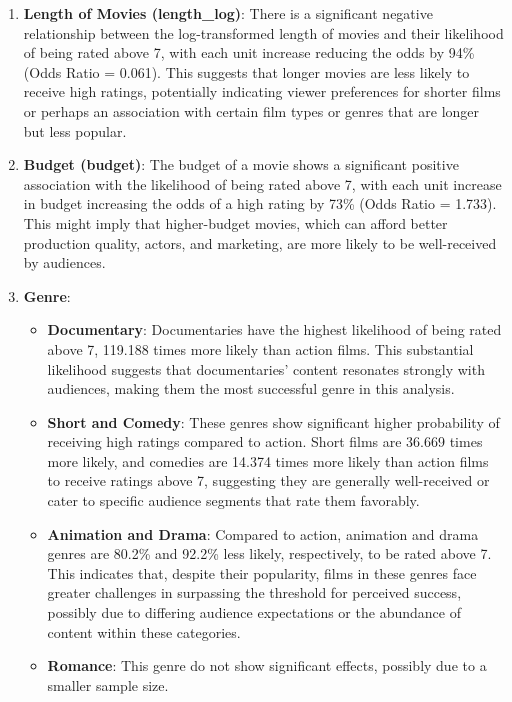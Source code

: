 \documentclass[
  11pt,
]{article}
\providecommand{\tightlist}{%
  \setlength{\itemsep}{0pt}\setlength{\parskip}{0pt}}\usepackage{longtable,booktabs,array}
\begin{document}
\begin{enumerate}
\def\labelenumi{\arabic{enumi}.}
\item
  \textbf{Length of Movies (length\_log)}: There is a significant
  negative relationship between the log-transformed length of movies and
  their likelihood of being rated above 7, with each unit increase
  reducing the odds by 94\% (Odds Ratio = 0.061). This suggests that
  longer movies are less likely to receive high ratings, potentially
  indicating viewer preferences for shorter films or perhaps an
  association with certain film types or genres that are longer but less
  popular.
\item
  \textbf{Budget (budget)}: The budget of a movie shows a significant
  positive association with the likelihood of being rated above 7, with
  each unit increase in budget increasing the odds of a high rating by
  73\% (Odds Ratio = 1.733). This might imply that higher-budget movies,
  which can afford better production quality, actors, and marketing, are
  more likely to be well-received by audiences.
\item
  \textbf{Genre}:

  \begin{itemize}
  \tightlist
  \item
    \textbf{Documentary}: Documentaries have the highest likelihood of
    being rated above 7, 119.188 times more likely than action films.
    This substantial likelihood suggests that documentaries' content
    resonates strongly with audiences, making them the most successful
    genre in this analysis.
  \item
    \textbf{Short and Comedy}: These genres show significant higher
    probability of receiving high ratings compared to action. Short
    films are 36.669 times more likely, and comedies are 14.374 times
    more likely than action films to receive ratings above 7, suggesting
    they are generally well-received or cater to specific audience
    segments that rate them favorably.
  \item
    \textbf{Animation and Drama}: Compared to action, animation and
    drama genres are 80.2\% and 92.2\% less likely, respectively, to be
    rated above 7. This indicates that, despite their popularity, films
    in these genres face greater challenges in surpassing the threshold
    for perceived success, possibly due to differing audience
    expectations or the abundance of content within these categories.
  \item
    \textbf{Romance}: This genre do not show significant effects,
    possibly due to a smaller sample size.
  \end{itemize}
\end{enumerate}
\end{document}
